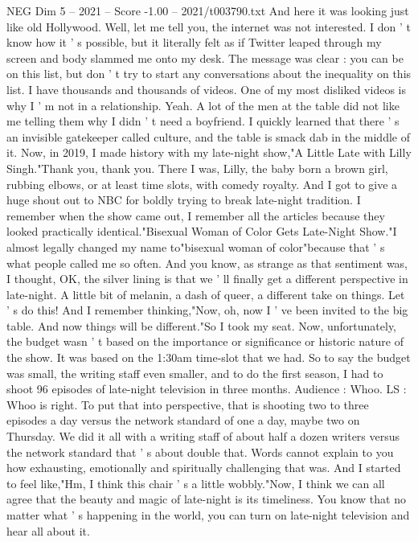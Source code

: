 \begin{textsample}{NEG Dim 5 – 2021 – Score -1.00 – 2021/t003790.txt}
And here it was looking just like old Hollywood.
Well, let me tell you, the internet was not interested.
I don ' t know how it ' s possible, but it literally felt as if Twitter leaped through my screen and body slammed me onto my desk.
The message was clear : you can be on this list, but don ' t try to start any conversations about the inequality on this list.
I have thousands and thousands of videos.
One of my most disliked videos is why I ' m not in a relationship.
Yeah.
A lot of the men at the table did not like me telling them why I didn ' t need a boyfriend.
I quickly learned that there ' s an invisible gatekeeper called culture, and the table is smack dab in the middle of it.
Now, in 2019, I made history with my late-night show,"A Little Late with Lilly Singh."Thank you, thank you.
There I was, Lilly, the baby born a brown girl, rubbing elbows, or at least time slots, with comedy royalty.
And I got to give a huge shout out to NBC for boldly trying to break late-night tradition.
I remember when the show came out, I remember all the articles because they looked practically identical."Bisexual Woman of Color Gets Late-Night Show."I almost legally changed my name to"bisexual woman of color"because that ' s what people called me so often.
And you know, as strange as that sentiment was, I thought, OK, the silver lining is that we ' ll finally get a different perspective in late-night.
A little bit of melanin, a dash of queer, a different take on things.
Let ' s do this!
And I remember thinking,"Now, oh, now I ' ve been invited to the big table.
And now things will be different."So I took my seat.
Now, unfortunately, the budget wasn ' t based on the importance or significance or historic nature of the show.
It was based on the 1:30am time-slot that we had.
So to say the budget was small, the writing staff even smaller, and to do the first season, I had to shoot 96 episodes of late-night television in three months.
Audience : Whoo.
LS : Whoo is right.
To put that into perspective, that is shooting two to three episodes a day versus the network standard of one a day, maybe two on Thursday.
We did it all with a writing staff of about half a dozen writers versus the network standard that ' s about double that.
Words cannot explain to you how exhausting, emotionally and spiritually challenging that was.
And I started to feel like,"Hm, I think this chair ' s a little wobbly."Now, I think we can all agree that the beauty and magic of late-night is its timeliness.
You know that no matter what ' s happening in the world, you can turn on late-night television and hear all about it.

\end{textsample}
